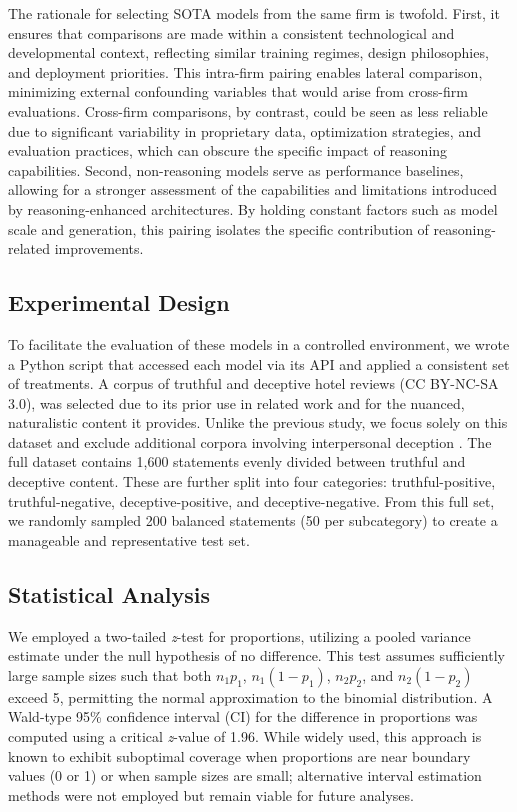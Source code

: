 \documentclass{article}
\begin{document}
The rationale for selecting SOTA models from the same firm is twofold. First, it ensures that comparisons are made within a consistent technological and developmental context, reflecting similar training regimes, design philosophies, and deployment priorities. This intra-firm pairing enables lateral comparison, minimizing external confounding variables that would arise from cross-firm evaluations. Cross-firm comparisons, by contrast, could be seen as less reliable due to significant variability in proprietary data, optimization strategies, and evaluation practices, which can obscure the specific impact of reasoning capabilities. Second, non-reasoning models serve as performance baselines, allowing for a stronger assessment of the capabilities and limitations introduced by reasoning-enhanced architectures. By holding constant factors such as model scale and generation, this pairing isolates the specific contribution of reasoning-related improvements.

\subsection{Experimental Design}

To facilitate the evaluation of these models in a controlled environment, we wrote a Python script that accessed each model via its API and applied a consistent set of treatments. A corpus of truthful and deceptive hotel reviews \citep{ott_finding_2011} (CC BY-NC-SA 3.0), was selected due to its prior use in related work \citep{markowitz_generative_2024} and for the nuanced, naturalistic content it provides. Unlike the previous study, we focus solely on this dataset and exclude additional corpora involving interpersonal deception \citep{markowitz_when_2020, lloyd_miami_2019}. The full dataset contains 1,600 statements evenly divided between truthful and deceptive content. These are further split into four categories: truthful-positive, truthful-negative, deceptive-positive, and deceptive-negative. From this full set, we randomly sampled 200 balanced statements (50 per subcategory) to create a manageable and representative test set.

\subsection{Statistical Analysis}

We employed a two-tailed \textit{z}-test for proportions, utilizing a pooled variance estimate under the null hypothesis of no difference. This test assumes sufficiently large sample sizes such that both $n_1p_1$, $n_1(1-p_1)$, $n_2p_2$, and $n_2(1-p_2)$ exceed 5, permitting the normal approximation to the binomial distribution. A Wald-type 95\% confidence interval (CI) for the difference in proportions was computed using a critical \textit{z}-value of 1.96. While widely used, this approach is known to exhibit suboptimal coverage when proportions are near boundary values (0 or 1) or when sample sizes are small; alternative interval estimation methods were not employed but remain viable for future analyses.
\end{document}
